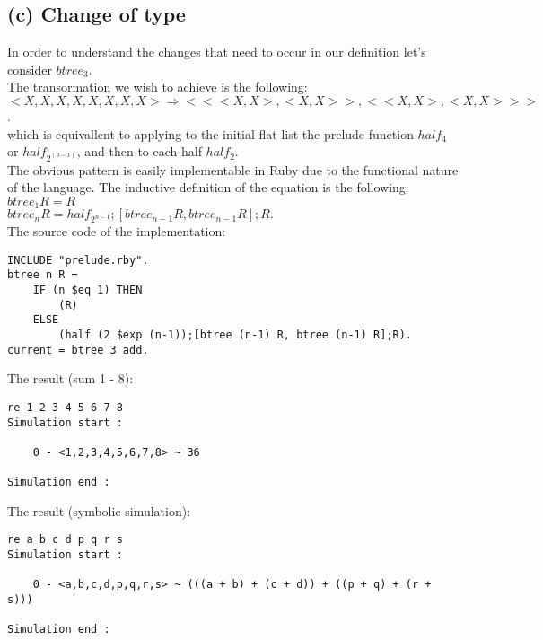 \documentclass[a4paper,10pt]{article}
\begin{document}
\subsection*{(c) Change of type}
In order to understand the changes that need to occur in our definition let's consider $btree_3$. \\[0.5cm]
The transormation we wish to achieve is the following: \\[0.25cm]
$<X,X,X,X,X,X,X,X> \Rightarrow <<<X,X>,<X,X>>,<<X,X>,<X,X>>>$. \\[0.25cm]
which is equivallent to applying to the initial flat list the prelude function $half_4$ or $half_{2^(3-1)}$, and then to each half $half_2$. \\[0.25cm]
The obvious pattern is easily implementable in Ruby due to the functional nature of the language. The inductive definition of the equation is the following:
\\[0.5cm]
$btree_1 R = R$ \\[0.25cm]
$btree_n R = half_{2^{n-1}};[btree_{n-1} R, btree_{n-1} R];R.$ \\[0.25cm]
The source code of the implementation:
\begin{Verbatim}
INCLUDE "prelude.rby".
btree n R =
	IF (n $eq 1) THEN
		(R)
	ELSE
		(half (2 $exp (n-1));[btree (n-1) R, btree (n-1) R];R).
current = btree 3 add.
\end{Verbatim}
The result (sum 1 - 8):
\begin{Verbatim}
re 1 2 3 4 5 6 7 8
Simulation start :

    0 - <1,2,3,4,5,6,7,8> ~ 36

Simulation end :
\end{Verbatim}
The result (symbolic simulation):
\begin{Verbatim}
re a b c d p q r s
Simulation start :

    0 - <a,b,c,d,p,q,r,s> ~ (((a + b) + (c + d)) + ((p + q) + (r + s)))

Simulation end :
\end{Verbatim}
\end{document}
